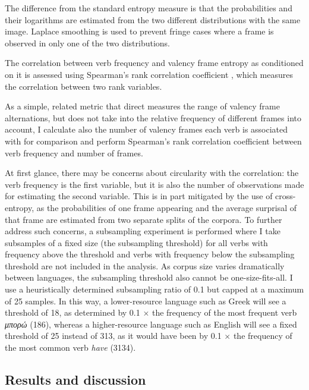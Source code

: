 The difference from the standard entropy measure is that the probabilities and their logarithms are estimated from the two different distributions with the same image. Laplace smoothing is used to prevent fringe cases where a frame is observed in only one of the two distributions.

The correlation between verb frequency and valency frame entropy as conditioned on it is assessed using Spearman's rank correlation coefficient \citep{spearman1904}, which measures the correlation between two rank variables. 

As a simple, related metric that direct measures the range of valency frame alternations, but does not take into the relative frequency of different frames into account, I calculate also the number of valency frames each verb is associated with for comparison and perform Spearman's rank correlation coefficient between verb frequency and number of frames.

At first glance, there may be concerns about circularity with the correlation: the verb frequency is the first variable, but it is also the number of observations made for estimating the second variable. This is in part mitigated by the use of cross-entropy, as the probabilities of one frame appearing and the average surprisal of that frame are estimated from two separate splits of the corpora. To further address such concerns, a subsampling experiment is performed where I take subsamples of a fixed size (the subsampling threshold) for all verbs with frequency above the threshold and verbs with frequency below the subsampling threshold are not included in the analysis. As corpus size varies dramatically between languages, the subsampling threshold also cannot be one-size-fits-all. I use a heuristically determined subsampling ratio of 0.1 but capped at a maximum of 25 samples. In this way, a lower-resource language such as Greek will see a threshold of 18, as determined by 0.1 $\times$ the frequency of the most frequent verb \textit{μπορώ} (186), whereas a higher-resource language such as English will see a fixed threshold of 25 instead of 313, as it would have been by 0.1 $\times$ the frequency of the most common verb \textit{have} (3134).

\subsection{Results and discussion}

